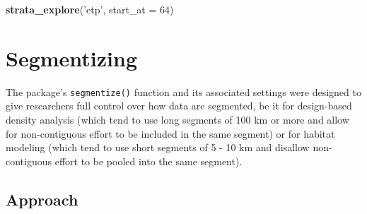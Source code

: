 \documentclass[
]{book}
\newenvironment{Shaded}{\begin{snugshade}}{\end{snugshade}}
\newcommand{\DataTypeTok}[1]{\textcolor[rgb]{0.13,0.29,0.53}{#1}}
\newcommand{\DecValTok}[1]{\textcolor[rgb]{0.00,0.00,0.81}{#1}}
\newcommand{\KeywordTok}[1]{\textcolor[rgb]{0.13,0.29,0.53}{\textbf{#1}}}
\newcommand{\NormalTok}[1]{#1}
\newcommand{\StringTok}[1]{\textcolor[rgb]{0.31,0.60,0.02}{#1}}
\begin{document}
\begin{Shaded}
\begin{Highlighting}[]
\KeywordTok{strata_explore}\NormalTok{(}\StringTok{'etp'}\NormalTok{,}
               \DataTypeTok{start_at =} \DecValTok{64}\NormalTok{)}
\end{Highlighting}
\end{Shaded}

\hypertarget{segmentizing}{%
\chapter{Segmentizing}\label{segmentizing}}

The package's \texttt{segmentize()} function and its associated settings were designed to give researchers full control over how data are segmented, be it for design-based density analysis (which tend to use long segments of 100 km or more and allow for non-contiguous effort to be included in the same segment) or for habitat modeling (which tend to use short segments of 5 - 10 km and disallow non-contiguous effort to be pooled into the same segment).

\hypertarget{approach}{%
\section*{Approach}\label{approach}}
\end{document}
